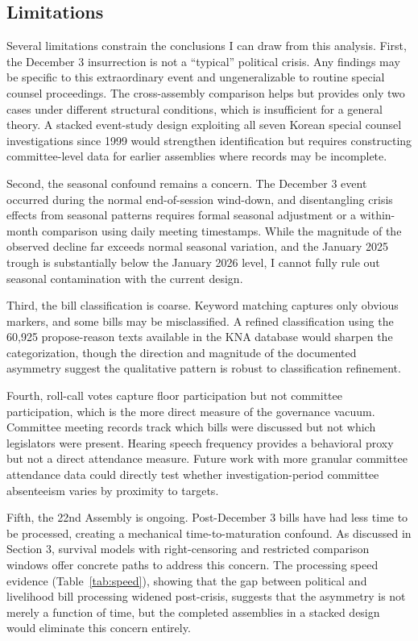 \documentclass[11pt]{article}
\begin{document}
\subsection*{Limitations}

Several limitations constrain the conclusions I can draw from this analysis. First, the December 3 insurrection is not a ``typical'' political crisis. Any findings may be specific to this extraordinary event and ungeneralizable to routine special counsel proceedings. The cross-assembly comparison helps but provides only two cases under different structural conditions, which is insufficient for a general theory. A stacked event-study design exploiting all seven Korean special counsel investigations since 1999 would strengthen identification but requires constructing committee-level data for earlier assemblies where records may be incomplete.

Second, the seasonal confound remains a concern. The December 3 event occurred during the normal end-of-session wind-down, and disentangling crisis effects from seasonal patterns requires formal seasonal adjustment or a within-month comparison using daily meeting timestamps. While the magnitude of the observed decline far exceeds normal seasonal variation, and the January 2025 trough is substantially below the January 2026 level, I cannot fully rule out seasonal contamination with the current design.

Third, the bill classification is coarse. Keyword matching captures only obvious markers, and some bills may be misclassified. A refined classification using the 60,925 propose-reason texts available in the KNA database would sharpen the categorization, though the direction and magnitude of the documented asymmetry suggest the qualitative pattern is robust to classification refinement.

Fourth, roll-call votes capture floor participation but not committee participation, which is the more direct measure of the governance vacuum. Committee meeting records track which bills were discussed but not which legislators were present. Hearing speech frequency provides a behavioral proxy but not a direct attendance measure. Future work with more granular committee attendance data could directly test whether investigation-period committee absenteeism varies by proximity to targets.

Fifth, the 22nd Assembly is ongoing. Post-December 3 bills have had less time to be processed, creating a mechanical time-to-maturation confound. As discussed in Section 3, survival models with right-censoring and restricted comparison windows offer concrete paths to address this concern. The processing speed evidence (Table~\ref{tab:speed}), showing that the gap between political and livelihood bill processing widened post-crisis, suggests that the asymmetry is not merely a function of time, but the completed assemblies in a stacked design would eliminate this concern entirely.
\end{document}
